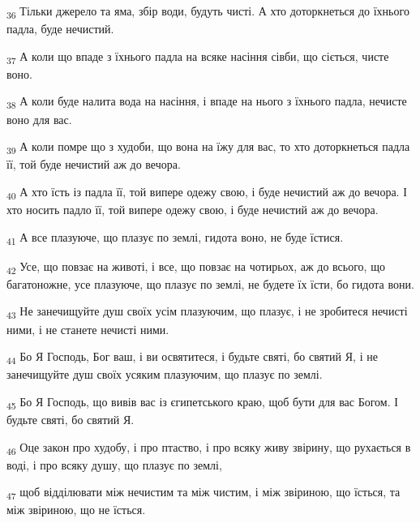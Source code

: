 \begin{tcolorbox}
\textsubscript{36} Тільки джерело та яма, збір води, будуть чисті. А хто доторкнеться до їхнього падла, буде нечистий.
\end{tcolorbox}
\begin{tcolorbox}
\textsubscript{37} А коли що впаде з їхнього падла на всяке насіння сівби, що сіється, чисте воно.
\end{tcolorbox}
\begin{tcolorbox}
\textsubscript{38} А коли буде налита вода на насіння, і впаде на нього з їхнього падла, нечисте воно для вас.
\end{tcolorbox}
\begin{tcolorbox}
\textsubscript{39} А коли помре що з худоби, що вона на їжу для вас, то хто доторкнеться падла її, той буде нечистий аж до вечора.
\end{tcolorbox}
\begin{tcolorbox}
\textsubscript{40} А хто їсть із падла її, той випере одежу свою, і буде нечистий аж до вечора. І хто носить падло її, той випере одежу свою, і буде нечистий аж до вечора.
\end{tcolorbox}
\begin{tcolorbox}
\textsubscript{41} А все плазуюче, що плазує по землі, гидота воно, не буде їстися.
\end{tcolorbox}
\begin{tcolorbox}
\textsubscript{42} Усе, що повзає на животі, і все, що повзає на чотирьох, аж до всього, що багатоножне, усе плазуюче, що плазує по землі, не будете їх їсти, бо гидота вони.
\end{tcolorbox}
\begin{tcolorbox}
\textsubscript{43} Не занечищуйте душ своїх усім плазуючим, що плазує, і не зробитеся нечисті ними, і не станете нечисті ними.
\end{tcolorbox}
\begin{tcolorbox}
\textsubscript{44} Бо Я Господь, Бог ваш, і ви освятитеся, і будьте святі, бо святий Я, і не занечищуйте душ своїх усяким плазуючим, що плазує по землі.
\end{tcolorbox}
\begin{tcolorbox}
\textsubscript{45} Бо Я Господь, що вивів вас із єгипетського краю, щоб бути для вас Богом. І будьте святі, бо святий Я.
\end{tcolorbox}
\begin{tcolorbox}
\textsubscript{46} Оце закон про худобу, і про птаство, і про всяку живу звірину, що рухається в воді, і про всяку душу, що плазує по землі,
\end{tcolorbox}
\begin{tcolorbox}
\textsubscript{47} щоб відділювати між нечистим та між чистим, і між звіриною, що їсться, та між звіриною, що не їсться.
\end{tcolorbox}
